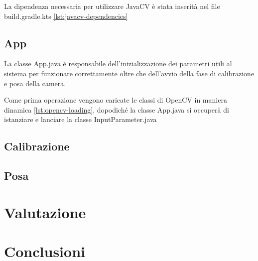 \documentclass[12pt,a4paper,openright,twoside]{book}
\begin{document}
La dipendenza necessaria per utilizzare JavaCV è stata inserità nel file build.gradle.kts \cref{lst:javacv-dependencies}


\section{App}
La classe App.java è responsabile dell'inizializzazione dei parametri utili al sistema per funzionare correttamente oltre che dell'avvio della fase di calibrazione e posa della camera.

Come prima operazione vengono caricate le classi di OpenCV in maniera dinamica \cref{lst:opencv-loading}, dopodiché la classe App.java si occuperà di istanziare e lanciare la classe InputParameter.java 


\section{Calibrazione}
\section{Posa}



\chapter{Valutazione}
\chapter{Conclusioni}
\end{document}
